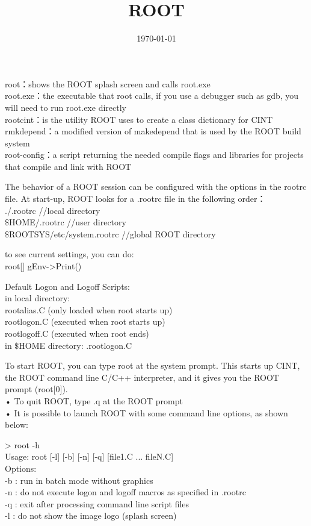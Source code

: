\documentclass[12pt,a4paper]{article}
\title{ROOT}
\author{}
\date{\today}
\begin{document}
\maketitle
root：shows the ROOT splash screen and calls root.exe \\
root.exe：the executable that root calls, if you use a debugger such as gdb, you will need to run root.exe directly \\
rootcint：is the utility ROOT uses to create a class dictionary for CINT \\
rmkdepend：a modified version of makedepend that is used by the ROOT build system \\
root-config：a script returning the needed compile flags and libraries for projects that compile and link with ROOT

The behavior of a ROOT session can be configured with the options in the rootrc file. At start-up, ROOT looks for a .rootrc file in the following order：\\
./.rootrc //local directory \\
$\$$HOME/.rootrc //user directory \\
$\$$ROOTSYS/etc/system.rootrc //global ROOT directory

to see current settings, you can do: \\
root[] gEnv->Print()

Default Logon and Logoff Scripts: \\
in local directory: \\
    rootalias.C (only loaded when root starts up) \\
    rootlogon.C (executed when root starts up) \\
    rootlogoff.C (executed when root ends) \\
    in $\$$HOME directory: .rootlogon.C

To start ROOT, you can type root at the system prompt. This starts up CINT, the ROOT command line C/C++ interpreter, and it gives you the ROOT prompt (root[0]). \\
• To quit ROOT, type .q at the ROOT prompt \\
• It is possible to launch ROOT with some command line options, as shown below:

> root -h \\
Usage: root [-l] [-b] [-n] [-q] [file1.C ... fileN.C] \\
Options: \\
-b : run in batch mode without graphics \\
-n : do not execute logon and logoff macros as specified in .rootrc \\
-q : exit after processing command line script files \\
-l : do not show the image logo (splash screen)
\end{document}

